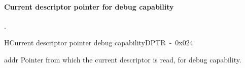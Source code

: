 \paragraph{Current descriptor pointer for debug capability}.\\

\begin{register}{H}{Current descriptor pointer debug capability}{DPTR~-~0x024}
    \label{reg_dptr}%
    \regnewline%
    \begin{regdesc}\begin{reglist}
        \item [addr]Pointer from which the current descriptor is read, for debug capability.
\end{reglist}\end{regdesc}\end{register}



